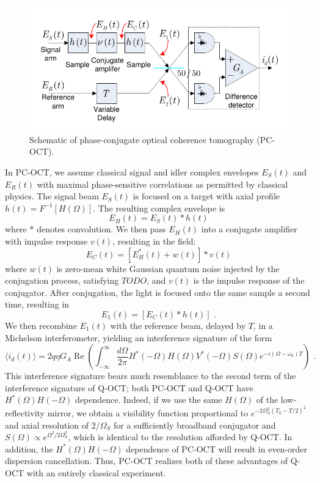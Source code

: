 \begin{figure}[t]
\begin{center}
\includegraphics[width=13cm]{figure-pcoct-schematic-pcoct.pdf}
\caption{Schematic of phase-conjugate optical coherence tomography (PC-OCT).}
\label{figure:pcoct-schematic-pcoct}
\end{center}
\end{figure}

In PC-OCT, we assume classical signal and idler complex envelopes $E_S(t)$ and $E_R(t)$ with maximal phase-sensitive correlations as permitted by classical physics. The signal beam $E_S(t)$ is focused on a target with axial profile $h(t) = F^{-1}[H(\Omega)]$. The resulting complex envelope is
\begin{equation}
E_H(t) = E_S(t) * h(t)
\end{equation}
where $*$ denotes convolution. We then pass $E_H(t)$ into a conjugate amplifier with impulse response $v(t)$, resulting in the field:
\begin{equation}
E_C(t) = \left[ E_H^*(t) + w(t) \right] * v(t)
\end{equation}
where $w(t)$ is zero-mean white Gaussian quantum noise injected by the conjugation process, satisfying $TODO$, and $v(t)$ is the impulse response of the conjugator. After conjugation, the light is focused onto the same sample a second time, resulting in
\begin{equation}
E_1(t) = \left[ E_C(t) * h(t) \right]\,\,.
\end{equation}
We then recombine $E_1(t)$ with the reference beam, delayed by $T$, in a Michelson interferometer, yielding an interference signature of the form
\begin{equation}
\langle i_d(t) \rangle = 2q\eta G_A \operatorname{Re} \left( \int_{-\infty}^{\infty} \frac{d\Omega}{2\pi} H^*(-\Omega)H(\Omega)V^*(-\Omega)S(\Omega) e^{-i(\Omega-\omega_0)T} \right)\,\,.
\end{equation}
This interference signature bears much resemblance to the second term of the interference signature of Q-OCT; both PC-OCT and Q-OCT have $H^*(\Omega)H(-\Omega)$ dependence. Indeed, if we use the same $H(\Omega)$ of the low-reflectivity mirror, we obtain a visibility function proportional to $e^{-2\Omega_S^2(T_0 - T/2)^2}$ and axial resolution of $2/\Omega_S$ for a sufficiently broadband conjugator and $S(\Omega) \propto e^{\Omega^2/2\Omega_S^2}$, which is identical to the resolution afforded by Q-OCT. In addition, the $H^*(\Omega)H(-\Omega)$ dependence of PC-OCT will result in even-order dispersion cancellation. Thus, PC-OCT realizes both of these advantages of Q-OCT with an entirely classical experiment.

